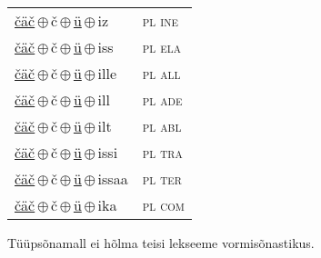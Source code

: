 \begin{minipage}{\textwidth}
\begin{sideways}
\begin{tabular}{l l}
\underline{čäč}\,$\oplus$\,č\,$\oplus$\,\underline{ü}\,$\oplus$\,iz & \textsc{ pl ine } \\
\underline{čäč}\,$\oplus$\,č\,$\oplus$\,\underline{ü}\,$\oplus$\,iss & \textsc{ pl ela } \\
\underline{čäč}\,$\oplus$\,č\,$\oplus$\,\underline{ü}\,$\oplus$\,ille & \textsc{ pl all } \\
\underline{čäč}\,$\oplus$\,č\,$\oplus$\,\underline{ü}\,$\oplus$\,ill & \textsc{ pl ade } \\
\underline{čäč}\,$\oplus$\,č\,$\oplus$\,\underline{ü}\,$\oplus$\,ilt & \textsc{ pl abl } \\
\underline{čäč}\,$\oplus$\,č\,$\oplus$\,\underline{ü}\,$\oplus$\,issi & \textsc{ pl tra } \\
\underline{čäč}\,$\oplus$\,č\,$\oplus$\,\underline{ü}\,$\oplus$\,issaa & \textsc{ pl ter } \\
\underline{čäč}\,$\oplus$\,č\,$\oplus$\,\underline{ü}\,$\oplus$\,ika & \textsc{ pl com } \\
\end{tabular}
\end{sideways}
\label{tab:tüüpsõnamall-čäčüd}

\end{minipage}

 
\vspace{1em}
\noindent Tüüpsõnamall  ei hõlma teisi lekseeme vormi\-sõnastikus.
